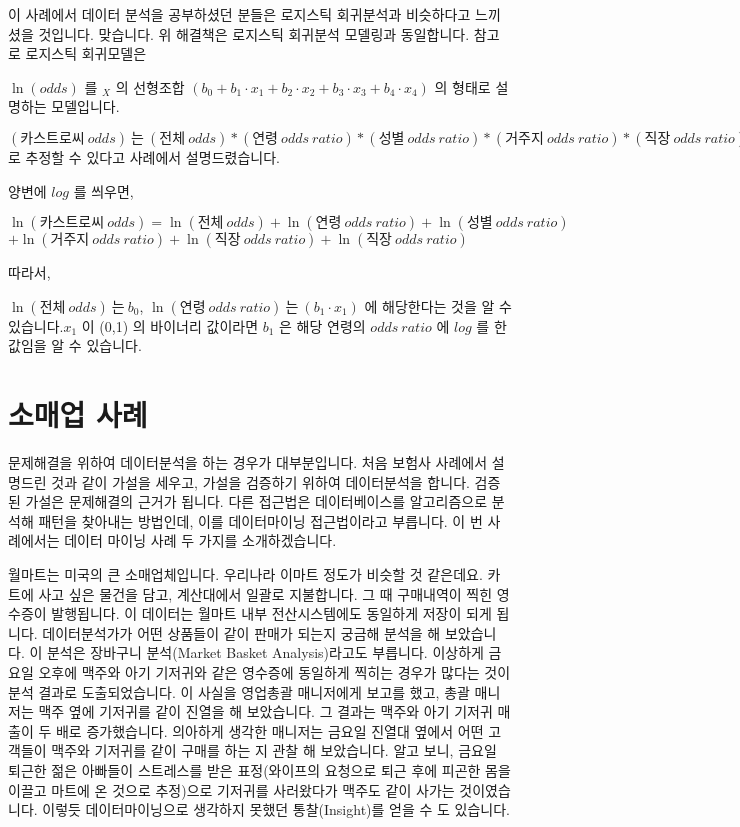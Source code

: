 \documentclass[letterpaper,10pt,english]{jupyterBook}
\begin{document}
\sphinxAtStartPar
이 사례에서 데이터 분석을 공부하셨던 분들은 로지스틱 회귀분석과 비슷하다고 느끼 셨을 것입니다. 맞습니다. 위 해결책은 로지스틱 회귀분석 모델링과 동일합니다.
참고로 로지스틱 회귀모델은

\sphinxAtStartPar
\( \ln(odds) \) 를 \( _X \) 의 선형조합 \( (b_0 + b_1 \cdot x_1 + b_2 \cdot x_2 + b_3 \cdot x_3 + b_4  \cdot x_4) \)  의 형태로 설명하는 모델입니다.

\sphinxAtStartPar
\( (카스트로씨 \ odds) \ 는 \ (전체 \ odds) * (연령\ odds\ ratio) * (성별\ odds\ ratio) * (거주지\ odds\ ratio) * (직장\ odds\ ratio) \)로 추정할 수 있다고 사례에서 설명드렸습니다.

\sphinxAtStartPar
양변에 \(log\) 를 씌우면,

\sphinxAtStartPar
\( \ln(카스트로씨\ odds) = \ln(전체\ odds)  + \ln(연령\ odds\ ratio) + \ln(성별\ odds\ ratio)\)\( + \ln(거주지\ odds\ ratio) + \ln(직장\ odds\ ratio) + \ln(직장\ odds\ ratio) \)

\sphinxAtStartPar
따라서,

\sphinxAtStartPar
\( \ln(전체\ odds)\ 는 \ b_0 \),  \( \ln(연령\ odds\ ratio)\ 는\ (b_1 \cdot x_1) \) 에 해당한다는 것을 알 수 있습니다.\( x_1 \) 이 (0,1) 의 바이너리 값이라면 \( b_1 \) 은 해당 연령의 \( odds\ ratio \) 에 \( log \) 를 한 값임을 알 수 있습니다.




\section{소매업 사례}
\label{\detokenize{chapter3/3.1.3_Use_Case:id1}}\label{\detokenize{chapter3/3.1.3_Use_Case::doc}}
\sphinxAtStartPar
문제해결을 위하여 데이터분석을 하는 경우가 대부분입니다.  처음 보험사 사례에서 설명드린 것과 같이 가설을 세우고, 가설을 검증하기 위하여 데이터분석을 합니다. 검증된 가설은 문제해결의 근거가 됩니다. 다른 접근법은 데이터베이스를 알고리즘으로 분석해 패턴을 찾아내는 방법인데, 이를 데이터마이닝 접근법이라고 부릅니다. 이 번 사례에서는 데이터 마이닝 사례 두 가지를 소개하겠습니다.

\sphinxAtStartPar
월마트는 미국의 큰 소매업체입니다. 우리나라 이마트 정도가 비슷할 것 같은데요. 카트에 사고 싶은 물건을 담고, 계산대에서 일괄로 지불합니다. 그 때 구매내역이 찍힌 영수증이 발행됩니다. 이 데이터는 월마트 내부 전산시스템에도 동일하게 저장이 되게 됩니다. 데이터분석가가 어떤 상품들이 같이 판매가 되는지 궁금해 분석을 해 보았습니다. 이 분석은 장바구니 분석(Market Basket Analysis)라고도 부릅니다. 이상하게 금요일 오후에 맥주와 아기 기저귀와 같은 영수증에 동일하게 찍히는 경우가 많다는 것이 분석 결과로 도출되었습니다. 이 사실을 영업총괄 매니저에게 보고를 했고, 총괄 매니저는 맥주 옆에 기저귀를 같이 진열을 해 보았습니다. 그 결과는 맥주와 아기 기저귀 매출이 두 배로 증가했습니다. 의아하게 생각한 매니저는 금요일 진열대 옆에서 어떤 고객들이 맥주와 기저귀를 같이 구매를 하는 지 관찰 해 보았습니다. 알고 보니, 금요일 퇴근한 젊은 아빠들이 스트레스를 받은 표정(와이프의 요청으로 퇴근 후에 피곤한 몸을 이끌고 마트에 온 것으로 추정)으로 기저귀를 사러왔다가 맥주도 같이 사가는 것이였습니다. 이렇듯 데이터마이닝으로 생각하지 못했던 통찰(Insight)를 얻을 수 도 있습니다.
\end{document}

